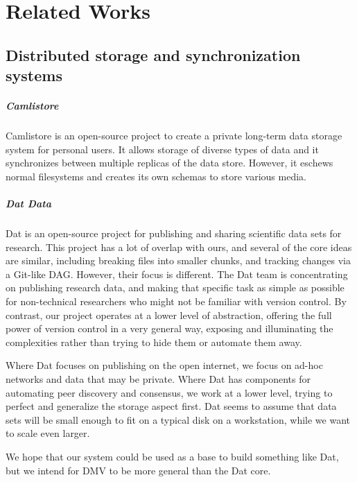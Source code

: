 \chapter{Related Works}

\section{Distributed storage and synchronization systems}

\paragraph{Camlistore}

Camlistore \cite{camlistore_homepage} is an open-source project to create a
private long-term data storage system for personal users. It allows storage of
diverse types of data and it synchronizes between multiple replicas of the data
store. However, it eschews normal filesystems and creates its own schemas to
store various media.


\paragraph{Dat Data}

Dat \cite{dat_homepage} is an open-source project for publishing and sharing
scientific data sets for research. This project has a lot of overlap with ours,
and several of the core ideas are similar, including breaking files into smaller
chunks, and tracking changes via a Git-like DAG. However, their focus is
different. The Dat team is concentrating on publishing research data, and making
that specific task as simple as possible for non-technical researchers who might
not be familiar with version control. By contrast, our project operates at a
lower level of abstraction, offering the full power of version control in a very
general way, exposing and illuminating the complexities rather than trying to
hide them or automate them away.

Where Dat focuses on publishing on the open internet, we focus on ad-hoc
networks and data that may be private. Where Dat has components for automating
peer discovery and consensus, we work at a lower level, trying to perfect and
generalize the storage aspect first. Dat seems to assume that data sets will be
small enough to fit on a typical disk on a workstation, while we want to scale
even larger.

We hope that our system could be used as a base to build something like Dat, but
we intend for DMV to be more general than the Dat core.


